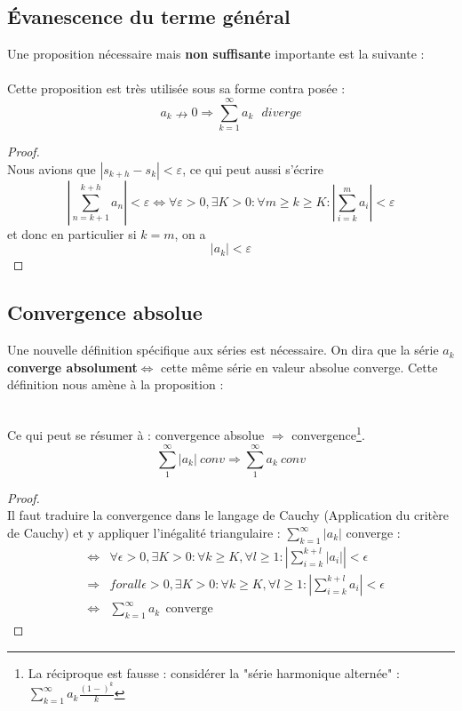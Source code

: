 \documentclass[11pt, a4paper, openany]{book}
\begin{document}
\subsection{Évanescence du terme général}
Une proposition nécessaire mais \textbf{non suffisante} importante est la suivante : \\
		
\ \\
		
Cette proposition est très utilisée sous sa forme contra posée :
\begin{equation}
	a_k \nrightarrow 0 \Rightarrow \sum_{k=1}^\infty a_k\ \ \ diverge
\end{equation}
\begin{proof}\ \\
	Nous avions que $|s_{k+h} - s_k| < \varepsilon$, ce qui peut aussi s'écrire $$\left|\sum_{n=k+1}^{k+h}a_n\right| < \varepsilon\Leftrightarrow\forall\varepsilon>0,\exists K>0:\forall m\geq k\geq K : \left|\sum_{i=k}^ma_i\right|<\varepsilon$$ et donc en particulier si $k=m$, on a $$|a_k|<\varepsilon$$
\end{proof}
\subsection{Convergence absolue}
Une nouvelle définition spécifique aux séries est nécessaire. On dira que la série $a_k$ \textbf{converge absolument}$\Leftrightarrow$ cette même série en valeur absolue converge. Cette définition nous amène à la proposition :
		
\ \\
		
Ce qui peut se résumer à : convergence absolue $\Rightarrow$ convergence\footnote{La réciproque est fausse : considérer la "série harmonique alternée" : $\sum_{k=1}^\infty a_k \frac{(1-)^k}{k}$}. $$\sum_1^{\infty}|a_k|\ conv\Rightarrow \sum_1^{\infty}a_k\ conv$$
\begin{proof}
	\ \\
	Il faut traduire la convergence dans le langage de Cauchy (Application du critère de Cauchy) et y appliquer l'inégalité triangulaire : $\sum_{k=1}^\infty |a_k|$ converge :
	\begin{eqnarray}
		&\Leftrightarrow & \forall \epsilon > 0, \exists K > 0 : \forall k \geq K, \forall l \geq 1 : \left|\sum_{i=k}^{k+l} |a_i| \right| < \epsilon\\
		&\Rightarrow & forall \epsilon > 0, \exists K > 0 : \forall k \geq K, \forall l \geq 1 : \left|\sum_{i=k}^{k+l} a_i \right| < \epsilon\\
		&\Leftrightarrow & \sum_{k=1}^\infty a_k\ \ \text{converge}
	\end{eqnarray}
\end{proof}
		
\end{document}
